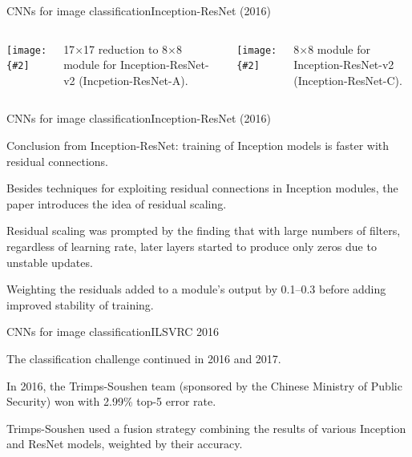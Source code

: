\documentclass[aspectratio=169]{beamer}
\newcommand{\myfig}[3]{\centerline{\texttt{[image: \{\#2]}}}
\begin{document}
\begin{frame}{CNNs for image classification}{Inception-ResNet (2016)}

  \begin{columns}

    \column{2in}
    
    \myfig{2in}{szegedy-16-fig18}{Szegedy et at.\ (2017), Fig.\ 18}

    \medskip

    17$\times$17 reduction to 8$\times$8 module for
    Inception-ResNet-v2 (Incpetion-ResNet-A).

    \column{2in}
    
    \myfig{1.5in}{szegedy-16-fig19}{Szegedy et at.\ (2017), Fig.\ 19}

    \medskip
    
    8$\times$8 module for Inception-ResNet-v2 (Inception-ResNet-C).
    
  \end{columns}
  
\end{frame}


\begin{frame}{CNNs for image classification}{Inception-ResNet (2016)}

  Conclusion from Inception-ResNet: training of Inception models is
  faster with residual connections.

  \medskip

  Besides techniques for exploiting residual connections in Inception
  modules, the paper introduces the idea of \alert{residual scaling}.

  \medskip

  Residual scaling was prompted by the finding that with large numbers
  of filters, regardless of learning rate, later layers started to
  produce only zeros due to unstable updates.

  \medskip

  Weighting the residuals added to a module's output by 0.1--0.3
  before adding improved stability of training.
  
\end{frame}


\begin{frame}{CNNs for image classification}{ILSVRC 2016}

  The classification challenge continued in 2016 and 2017.

  \medskip

  In 2016, the Trimps-Soushen team (sponsored by the Chinese Ministry
  of Public Security) won with 2.99\% top-5 error rate.

  \medskip

  Trimps-Soushen used a fusion strategy combining the results
  of various Inception and ResNet models, weighted by their accuracy.

\end{frame}
\end{document}
